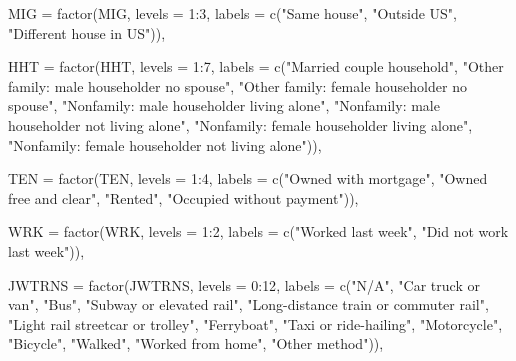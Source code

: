 \documentclass[
  letterpaper,
  DIV=11,
  numbers=noendperiod]{scrartcl}
\newenvironment{Shaded}{\begin{snugshade}}{\end{snugshade}}
\newcommand{\AttributeTok}[1]{\textcolor[rgb]{0.40,0.45,0.13}{#1}}
\newcommand{\DecValTok}[1]{\textcolor[rgb]{0.68,0.00,0.00}{#1}}
\newcommand{\FunctionTok}[1]{\textcolor[rgb]{0.28,0.35,0.67}{#1}}
\newcommand{\NormalTok}[1]{\textcolor[rgb]{0.00,0.23,0.31}{#1}}
\newcommand{\SpecialCharTok}[1]{\textcolor[rgb]{0.37,0.37,0.37}{#1}}
\newcommand{\StringTok}[1]{\textcolor[rgb]{0.13,0.47,0.30}{#1}}
\begin{document}
\begin{Shaded}
\begin{Highlighting}[]
    \AttributeTok{MIG =} \FunctionTok{factor}\NormalTok{(MIG, }\AttributeTok{levels =} \DecValTok{1}\SpecialCharTok{:}\DecValTok{3}\NormalTok{,}
                 \AttributeTok{labels =} \FunctionTok{c}\NormalTok{(}\StringTok{"Same house"}\NormalTok{, }\StringTok{"Outside US"}\NormalTok{, }\StringTok{"Different house in US"}\NormalTok{)),}

    \AttributeTok{HHT =} \FunctionTok{factor}\NormalTok{(HHT, }\AttributeTok{levels =} \DecValTok{1}\SpecialCharTok{:}\DecValTok{7}\NormalTok{,}
                 \AttributeTok{labels =} \FunctionTok{c}\NormalTok{(}\StringTok{"Married couple household"}\NormalTok{,}
                            \StringTok{"Other family: male householder no spouse"}\NormalTok{,}
                            \StringTok{"Other family: female householder no spouse"}\NormalTok{,}
                            \StringTok{"Nonfamily: male householder living alone"}\NormalTok{,}
                            \StringTok{"Nonfamily: male householder not living alone"}\NormalTok{,}
                            \StringTok{"Nonfamily: female householder living alone"}\NormalTok{,}
                            \StringTok{"Nonfamily: female householder not living alone"}\NormalTok{)),}

    \AttributeTok{TEN =} \FunctionTok{factor}\NormalTok{(TEN, }\AttributeTok{levels =} \DecValTok{1}\SpecialCharTok{:}\DecValTok{4}\NormalTok{,}
                 \AttributeTok{labels =} \FunctionTok{c}\NormalTok{(}\StringTok{"Owned with mortgage"}\NormalTok{, }\StringTok{"Owned free and clear"}\NormalTok{,}
                            \StringTok{"Rented"}\NormalTok{, }\StringTok{"Occupied without payment"}\NormalTok{)),}

    \AttributeTok{WRK =} \FunctionTok{factor}\NormalTok{(WRK, }\AttributeTok{levels =} \DecValTok{1}\SpecialCharTok{:}\DecValTok{2}\NormalTok{,}
                 \AttributeTok{labels =} \FunctionTok{c}\NormalTok{(}\StringTok{"Worked last week"}\NormalTok{, }\StringTok{"Did not work last week"}\NormalTok{)),}

    \AttributeTok{JWTRNS =} \FunctionTok{factor}\NormalTok{(JWTRNS, }\AttributeTok{levels =} \DecValTok{0}\SpecialCharTok{:}\DecValTok{12}\NormalTok{,}
                    \AttributeTok{labels =} \FunctionTok{c}\NormalTok{(}\StringTok{"N/A"}\NormalTok{, }\StringTok{"Car truck or van"}\NormalTok{, }\StringTok{"Bus"}\NormalTok{,}
                               \StringTok{"Subway or elevated rail"}\NormalTok{,}
                               \StringTok{"Long{-}distance train or commuter rail"}\NormalTok{,}
                               \StringTok{"Light rail streetcar or trolley"}\NormalTok{,}
                               \StringTok{"Ferryboat"}\NormalTok{, }\StringTok{"Taxi or ride{-}hailing"}\NormalTok{,}
                               \StringTok{"Motorcycle"}\NormalTok{, }\StringTok{"Bicycle"}\NormalTok{, }\StringTok{"Walked"}\NormalTok{,}
                               \StringTok{"Worked from home"}\NormalTok{, }\StringTok{"Other method"}\NormalTok{)),}


\end{Highlighting}
\end{Shaded}
\end{document}
